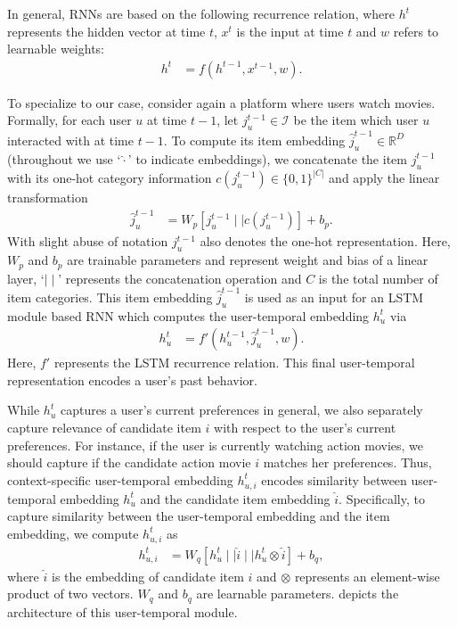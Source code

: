 In general, RNNs are based on the following recurrence relation, where $h^{t}$ represents the hidden vector at time $t$, $x^t$ is the input at time $t$ and $w$ refers to learnable weights:
\begin{align}
  h^{t} &= f(h^{t-1},x^{t-1}, w).
\end{align}

To specialize to our case, consider again a platform where users watch movies.
Formally, for each user $u$ at time $t-1$, let $j_u^{t-1} \in {\mathcal I}$ be the item which user $u$ interacted with at time $t-1$.  To compute its item embedding $\hat{j}_u^{t-1}\in\mathbb{R}^D$ (throughout we use `$\hat\cdot$' to indicate embeddings), we concatenate the item $j^{t-1}_u$  with its one-hot category information $c(j^{t-1}_u) \in \{0,1\}^{|C|}$ and apply the linear transformation
\begin{align}
  \hat{j}_u^{t-1} &= W_p [ j_u^{t-1} \mid \mid c(j^{t-1}_u)] + b_p.
\end{align}
With slight abuse of notation $j_u^{t-1}$ also denotes the one-hot representation.
Here, $W_p$ and $b_p$ are trainable parameters and represent weight and bias of a linear layer, `$ \mid \mid $' represents the concatenation operation and $C$ is the total number of item categories. This item embedding $\hat{j}_u^{t-1}$ is used as an input for an LSTM module based RNN which computes the user-temporal  embedding $h_u^{t}$ via
\begin{align}
  h_u^{t} &=  f'(h_u^{t-1}, \hat{j}_u^{t-1}, w).
\end{align}
Here, $f'$ represents the LSTM recurrence relation. This final user-temporal representation encodes a user's past behavior.

While $h_u^t$ captures a user's current preferences in general, we also separately capture relevance of candidate item $i$ with respect to the user's current preferences. For instance, if the user is currently watching action movies, we should capture if the candidate action movie $i$ matches her preferences.
Thus, context-specific user-temporal  embedding $h_{u,i}^t$ encodes similarity between user-temporal  embedding $h_u^t$ and the candidate item embedding $\hat{i}$.  Specifically, to capture similarity between the user-temporal embedding and the item embedding,
we compute $h_{u,i}^t$ as
\begin{align}
  h_{u,i}^{t} &=  W_q[h_u^{t} \mid \mid \hat{i} \mid \mid h_u^{t} \otimes \hat{i}] + b_q,
\end{align}
where $\hat{i}$ is the embedding of candidate item $i$ and $\otimes$ represents an element-wise product of two vectors. $W_q$ and $b_q$ are learnable parameters.  depicts the architecture of this user-temporal module.

